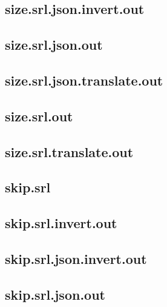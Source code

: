 \subsection{size.srl.json.invert.out}
\label{app:size_srl.json.invert.out}

\subsection{size.srl.json.out}
\label{app:size_srl.json.out}

\subsection{size.srl.json.translate.out}
\label{app:size_srl.json.translate.out}

\subsection{size.srl.out}
\label{app:size_srl.out}

\subsection{size.srl.translate.out}
\label{app:size_srl.translate.out}

\subsection{skip.srl}
\label{app:skip_srl}

\subsection{skip.srl.invert.out}
\label{app:skip_srl.invert.out}

\subsection{skip.srl.json.invert.out}
\label{app:skip_srl.json.invert.out}

\subsection{skip.srl.json.out}
\label{app:skip_srl.json.out}

